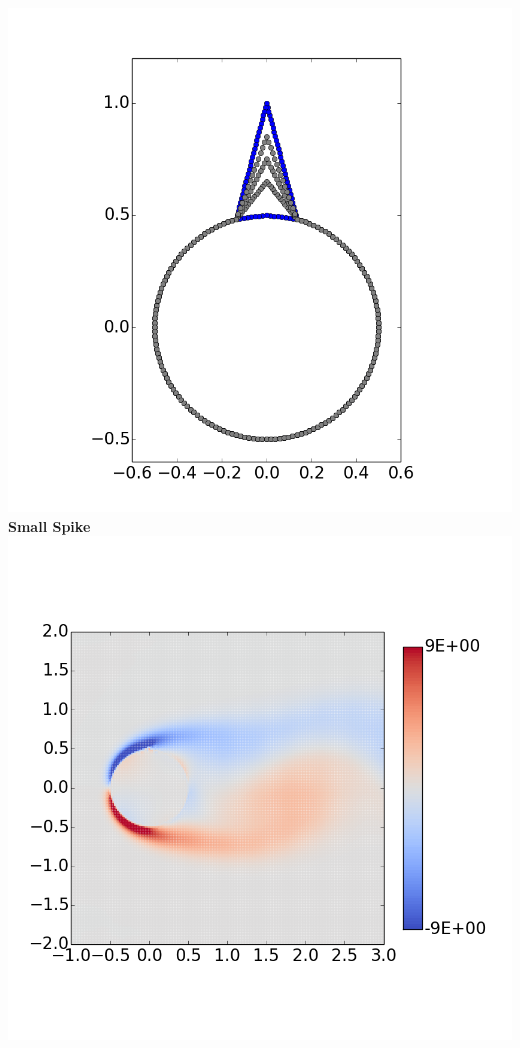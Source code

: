 \documentclass[9pt]{beamer}
\begin{document}
\begin{frame}
\begin{columns}[c]
   \centering
    \includegraphics[width=1\textwidth]{CylinderPerturbations}   
   \centering
    \textbf{Small Spike} \\
    \includegraphics[width=1\textwidth]{PerturbSmallHorn}

\end{columns}
\end{frame}
\end{document}
